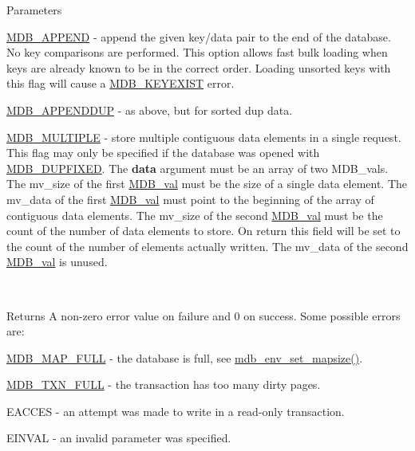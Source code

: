 \begin{DoxyParams}[1]{Parameters}
\begin{DoxyItemize}
\item \mbox{\hyperlink{group__mdb__put_ga06af7a6e87588fd723e2dd1d7e580e6a}{M\+D\+B\+\_\+\+A\+P\+P\+E\+ND}} -\/ append the given key/data pair to the end of the database. No key comparisons are performed. This option allows fast bulk loading when keys are already known to be in the correct order. Loading unsorted keys with this flag will cause a \mbox{\hyperlink{group__errors_ga05dc5bbcc7da81a7345bd8676e8e0e3b}{M\+D\+B\+\_\+\+K\+E\+Y\+E\+X\+I\+ST}} error. 
\item \mbox{\hyperlink{group__mdb__put_ga0583fe408057ff1c03b8dd071c0d68d2}{M\+D\+B\+\_\+\+A\+P\+P\+E\+N\+D\+D\+UP}} -\/ as above, but for sorted dup data. 
\item \mbox{\hyperlink{group__mdb__put_ga67a8d26a8c8bc56f02f2e03fd07a74b0}{M\+D\+B\+\_\+\+M\+U\+L\+T\+I\+P\+LE}} -\/ store multiple contiguous data elements in a single request. This flag may only be specified if the database was opened with \mbox{\hyperlink{group__mdb__dbi__open_ga5acc26f80668d1ebc31265d178c69338}{M\+D\+B\+\_\+\+D\+U\+P\+F\+I\+X\+ED}}. The {\bfseries data} argument must be an array of two M\+D\+B\+\_\+vals. The mv\+\_\+size of the first \mbox{\hyperlink{struct_m_d_b__val}{M\+D\+B\+\_\+val}} must be the size of a single data element. The mv\+\_\+data of the first \mbox{\hyperlink{struct_m_d_b__val}{M\+D\+B\+\_\+val}} must point to the beginning of the array of contiguous data elements. The mv\+\_\+size of the second \mbox{\hyperlink{struct_m_d_b__val}{M\+D\+B\+\_\+val}} must be the count of the number of data elements to store. On return this field will be set to the count of the number of elements actually written. The mv\+\_\+data of the second \mbox{\hyperlink{struct_m_d_b__val}{M\+D\+B\+\_\+val}} is unused. 
\end{DoxyItemize}\\
\hline
\end{DoxyParams}
\begin{DoxyReturn}{Returns}
A non-\/zero error value on failure and 0 on success. Some possible errors are\+: 
\begin{DoxyItemize}
\item \mbox{\hyperlink{group__errors_ga0a83370402a060c9175100d4bbfb9f25}{M\+D\+B\+\_\+\+M\+A\+P\+\_\+\+F\+U\+LL}} -\/ the database is full, see \mbox{\hyperlink{group__mdb_ga4c47a5830f1071e578eaa1bbda2ae83e}{mdb\+\_\+env\+\_\+set\+\_\+mapsize()}}. 
\item \mbox{\hyperlink{group__errors_gacba5cdc8618093f59d0339e88e69570e}{M\+D\+B\+\_\+\+T\+X\+N\+\_\+\+F\+U\+LL}} -\/ the transaction has too many dirty pages. 
\item E\+A\+C\+C\+ES -\/ an attempt was made to write in a read-\/only transaction. 
\item E\+I\+N\+V\+AL -\/ an invalid parameter was specified. 
\end{DoxyItemize}
\end{DoxyReturn}


